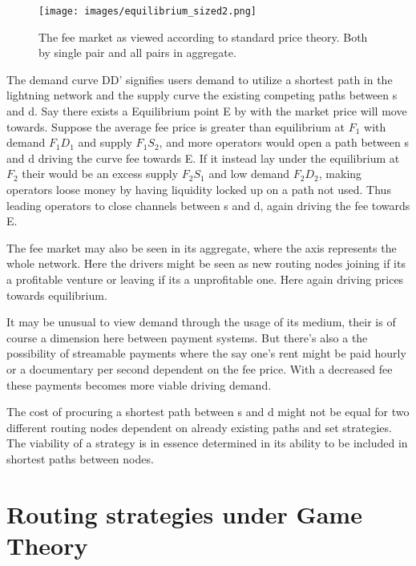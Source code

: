 \begin{figure}[!htb]
	\hspace*{-0.3cm} 
	\centering
	\texttt{[image: images/equilibrium\_sized2.png]}
	\caption{ The fee market as viewed according to standard price theory. Both by single pair and all pairs in aggregate. 
		}
		\label{fig:equilibrium}
		\hspace*{2mm} 	
\end{figure}

The demand curve DD' signifies users demand to utilize a shortest path in the lightning network and the supply curve the existing competing paths between s and d. Say there exists a Equilibrium point E by with the market price will move towards. Suppose the average fee price is greater than equilibrium at $F_{1}$ with demand $F_{1}D_{1}$ and supply $F_{1}S_{2}$, and more operators would open a path between s and d driving the curve fee towards E. If it instead lay under the equilibrium at $F_2$ their would be an excess supply $F_{2}S_{1}$ and low demand $F_{2}D_{2}$, making operators loose money by having liquidity locked up on a path not used. Thus leading operators to close channels between s and d, again driving the fee towards E.

The fee market may also be seen in its aggregate, where the axis represents the whole network. Here the drivers might be seen as new routing nodes joining if its a profitable venture or leaving if its a unprofitable one. Here again driving prices towards equilibrium. 

It may be unusual to view demand through the usage of its medium, their is of course a dimension here between payment systems. But there's also a the possibility of streamable payments where the say one's rent might be paid hourly or a documentary per second dependent on the fee price. With a decreased fee these payments becomes more viable driving demand.

The cost of procuring a shortest path between s and d might not be equal for two different routing nodes dependent on already existing paths and set strategies. The viability of a strategy is in essence determined in its ability to be included in shortest paths between nodes.

\section{Routing strategies under Game Theory}

